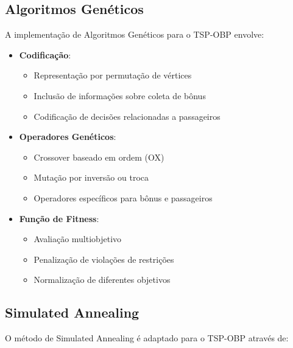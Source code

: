 \documentclass[12pt, a4paper]{report}
\begin{document}
\subsection{Algoritmos Genéticos}
A implementação de Algoritmos Genéticos para o TSP-OBP envolve:

\begin{itemize}
    \item \textbf{Codificação}: 
    \begin{itemize}
        \item Representação por permutação de vértices
        \item Inclusão de informações sobre coleta de bônus
        \item Codificação de decisões relacionadas a passageiros
    \end{itemize}
    
    \item \textbf{Operadores Genéticos}:
    \begin{itemize}
        \item Crossover baseado em ordem (OX)
        \item Mutação por inversão ou troca
        \item Operadores específicos para bônus e passageiros
    \end{itemize}
    
    \item \textbf{Função de Fitness}:
    \begin{itemize}
        \item Avaliação multiobjetivo
        \item Penalização de violações de restrições
        \item Normalização de diferentes objetivos
    \end{itemize}
\end{itemize}

\subsection{Simulated Annealing}
O método de Simulated Annealing é adaptado para o TSP-OBP através de:
\end{document}
